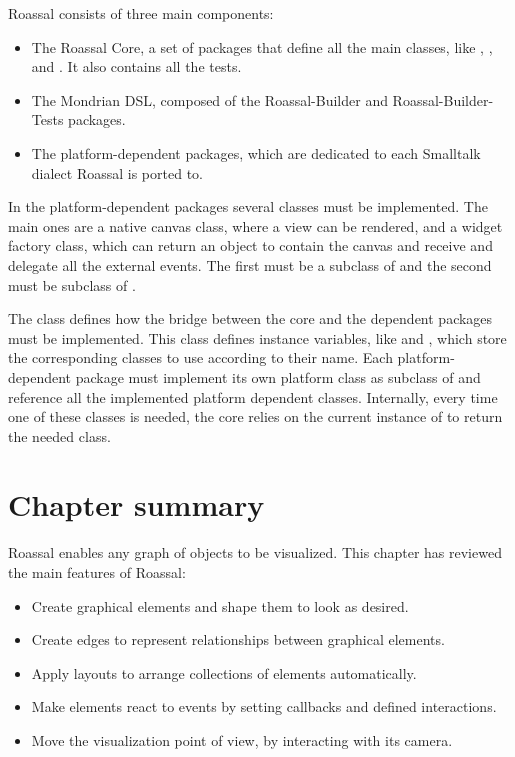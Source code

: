 \documentclass[a4paper,10pt,twoside]{book}
\newcommand{\fig}[4]{
		\begin{figure}[#1]
			\centering
			\texttt{[image: \#3]}
			\caption{\label{fig:#3}#4}
		\end{figure}}
\begin{document}
Roassal consists of three main components:

\begin{itemize}
\item  The Roassal Core, a set of packages that define all the main classes, like , ,  and . It also contains all the tests.
\item The Mondrian DSL, composed of the Roassal-Builder and Roassal-Builder-Tests packages.
\item The platform-dependent packages, which are dedicated to each Smalltalk dialect Roassal is ported to.
\end{itemize} 


In the platform-dependent packages several classes must be implemented. The main ones are a native canvas class, where a view can be rendered, and a widget factory class, which can return an object to contain the canvas and receive and delegate all the external events.
The first must be a subclass of  and the second must be subclass of .

The  class defines how the bridge between the core and the dependent packages must be implemented. This class defines instance variables, like  and , which store the corresponding classes to use according to their name. Each platform-dependent package must implement its own platform class as subclass of  and reference all the implemented platform dependent classes.
Internally, every time one of these classes is needed, the core relies on the current instance of  to return the needed class.



\section{Chapter summary}

Roassal enables any graph of objects to be visualized. This chapter has reviewed the main features of Roassal:

\begin{itemize}
\item Create graphical elements and shape them to look as desired.
\item Create edges to represent relationships between graphical elements.
\item Apply layouts to arrange collections of elements automatically.
\item Make elements react to events by setting callbacks and defined interactions.
\item Move the visualization point of view, by interacting with its camera.
\end{itemize}
\end{document}
